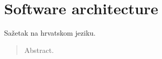\documentclass[times, utf8, zavrsni]{fer}
\begin{document}




\appendix
\chapter{Software architecture}




\begin{sazetak}
Sažetak na hrvatskom jeziku.

\end{sazetak}

\begin{abstract}
Abstract.

\end{abstract}
\end{document}
